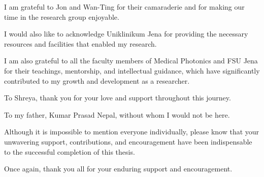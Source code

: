 \documentclass{micro-econ-thesis}
\begin{document}
I am grateful to Jon and Wan-Ting for their camaraderie and for making our time in the research group enjoyable.

I would also like to acknowledge Uniklinikum Jena for providing the necessary resources and facilities that enabled my research.


I am also grateful to all the faculty members of Medical Photonics and FSU Jena for their teachings, mentorship, and intellectual guidance, which have significantly contributed to my growth and development as a researcher.
 

To Shreya, thank you for your love and support throughout this journey.

To my father, Kumar Prasad Nepal, without whom I would not be here.

Although it is impossible to mention everyone individually, please know that your unwavering support, contributions, and encouragement have been indispensable to the successful completion of this thesis.

Once again, thank you all for your enduring support and encouragement.

\cleardoublepage
\tableofcontents

\cleardoublepage
{}
{}
\listoffigures
\cleardoublepage
{}
{}
\listoftables

\cleardoublepage
{}
{}
\end{document}
